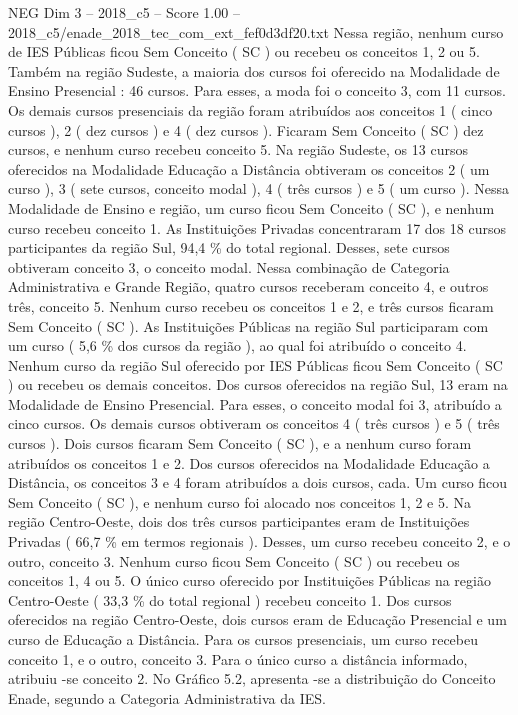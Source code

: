 \begin{textsample}{NEG Dim 3 – 2018\_c5 – Score 1.00 – 2018\_c5/enade\_2018\_tec\_com\_ext\_fef0d3df20.txt}
Nessa região, nenhum curso de IES Públicas ficou Sem Conceito ( SC ) ou recebeu os conceitos 1, 2 ou 5.
Também na região Sudeste, a maioria dos cursos foi oferecido na Modalidade de Ensino Presencial : 46 cursos.
Para esses, a moda foi o conceito 3, com 11 cursos.
Os demais cursos presenciais da região foram atribuídos aos conceitos 1 ( cinco cursos ), 2 ( dez cursos ) e 4 ( dez cursos ).
Ficaram Sem Conceito ( SC ) dez cursos, e nenhum curso recebeu conceito 5.
Na região Sudeste, os 13 cursos oferecidos na Modalidade Educação a Distância obtiveram os conceitos 2 ( um curso ), 3 ( sete cursos, conceito modal ), 4 ( três cursos ) e 5 ( um curso ).
Nessa Modalidade de Ensino e região, um curso ficou Sem Conceito ( SC ), e nenhum curso recebeu conceito 1.
As Instituições Privadas concentraram 17 dos 18 cursos participantes da região Sul, 94,4 \% do total regional.
Desses, sete cursos obtiveram conceito 3, o conceito modal.
Nessa combinação de Categoria Administrativa e Grande Região, quatro cursos receberam conceito 4, e outros três, conceito 5.
Nenhum curso recebeu os conceitos 1 e 2, e três cursos ficaram Sem Conceito ( SC ).
As Instituições Públicas na região Sul participaram com um curso ( 5,6 \% dos cursos da região ), ao qual foi atribuído o conceito 4.
Nenhum curso da região Sul oferecido por IES Públicas ficou Sem Conceito ( SC ) ou recebeu os demais conceitos.
Dos cursos oferecidos na região Sul, 13 eram na Modalidade de Ensino Presencial.
Para esses, o conceito modal foi 3, atribuído a cinco cursos.
Os demais cursos obtiveram os conceitos 4 ( três cursos ) e 5 ( três cursos ).
Dois cursos ficaram Sem Conceito ( SC ), e a nenhum curso foram atribuídos os conceitos 1 e 2.
Dos cursos oferecidos na Modalidade Educação a Distância, os conceitos 3 e 4 foram atribuídos a dois cursos, cada.
Um curso ficou Sem Conceito ( SC ), e nenhum curso foi alocado nos conceitos 1, 2 e 5.
Na região Centro-Oeste, dois dos três cursos participantes eram de Instituições Privadas ( 66,7 \% em termos regionais ).
Desses, um curso recebeu conceito 2, e o outro, conceito 3.
Nenhum curso ficou Sem Conceito ( SC ) ou recebeu os conceitos 1, 4 ou 5.
O único curso oferecido por Instituições Públicas na região Centro-Oeste ( 33,3 \% do total regional ) recebeu conceito 1.
Dos cursos oferecidos na região Centro-Oeste, dois cursos eram de Educação Presencial e um curso de Educação a Distância.
Para os cursos presenciais, um curso recebeu conceito 1, e o outro, conceito 3.
Para o único curso a distância informado, atribuiu -se conceito 2.
No Gráfico 5.2, apresenta -se a distribuição do Conceito Enade, segundo a Categoria Administrativa da IES.

\end{textsample}
